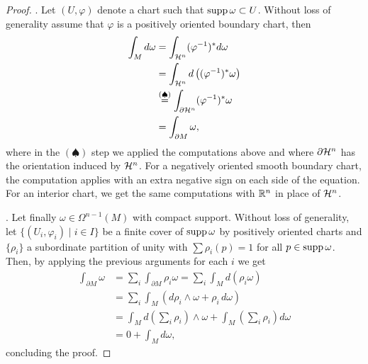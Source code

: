\begin{proof}
	.
	Let $(U,\varphi)$ denote a chart such that $\operatorname{supp} \omega \subset U$.
	Without loss of generality assume that $\varphi$ is a positively oriented boundary chart, then
	\begin{align}
		\int_M d\omega
		 & = \int_{\mathcal{H}^n}(\varphi^{-1})^* d\omega                                 \\
		 & = \int_{\mathcal{H}^n} d\left((\varphi^{-1})^* \omega\right)              \\
		 & \overset{(\spadesuit)}{=} \int_{\partial \mathcal{H}^n}(\varphi^{-1})^* \omega \\
		 & = \int_{\partial M} \omega ,
	\end{align}
	where in the $(\spadesuit)$ step we applied the computations above and where $\partial \mathcal{H}^n$ has the orientation induced by $\mathcal{H}^n$.
	For a negatively oriented smooth boundary chart, the computation applies with an extra negative sign on each side of the equation.
	For an interior chart, we get the same computations with $\mathbb{R}^n$ in place of $\mathcal{H}^n$.

	.
	Let finally $\omega\in\Omega^{n-1}(M)$ with compact support.
	Without loss of generality, let $\{(U_i, \varphi_i)\mid i\in I\}$ be a finite cover of $\operatorname{supp} \omega$ by positively oriented charts and $\{\rho_i\}$ a subordinate partition of unity with $\sum \rho_i(p) = 1$ for all $p\in\operatorname{supp} \omega$.
	Then, by applying the previous arguments for each $i$ we get
	\begin{align}
		\int_{\partial M} \omega
		 & = \sum_i \int_{\partial M} \rho_i\omega
		= \sum_i \int_M d(\rho_i \omega)                                                                \\
		 & = \sum_i \int_M (d\rho_i \wedge\omega + \rho_i\, d\omega)                                    \\
		 & = \int_M d\left(\sum_i \rho_i\right)\wedge\omega + \int_M \left(\sum_i \rho_i\right) d\omega \\
		 & = 0 + \int_M d\omega,
	\end{align}
	concluding the proof.
\end{proof}

